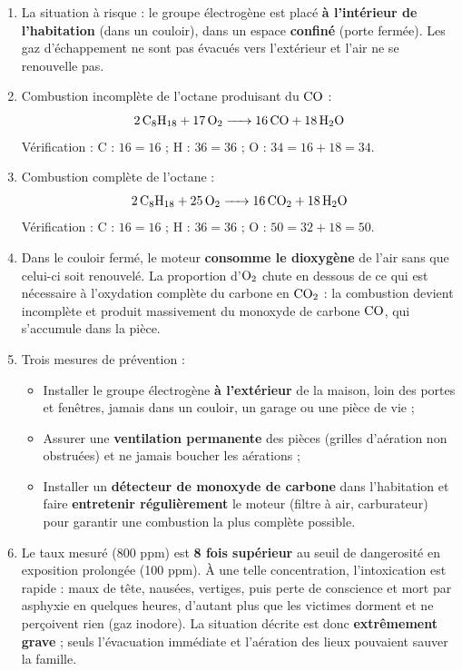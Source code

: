\documentclass[11pt]{article}
\begin{document}
\begin{corrige}
\begin{enumerate}
    \item La situation à risque : le groupe électrogène est placé \textbf{à l'intérieur de l'habitation} (dans un couloir), dans un espace \textbf{confiné} (porte fermée). Les gaz d'échappement ne sont pas évacués vers l'extérieur et l'air ne se renouvelle pas.
    \item Combustion incomplète de l'octane produisant du $\ce{CO}$ :
    \[ \ce{2C8H18 + 17O2 -> 16CO + 18H2O} \]
    Vérification : C : $16 = 16$ ; H : $36 = 36$ ; O : $34 = 16 + 18 = 34$.
    \item Combustion complète de l'octane :
    \[ \ce{2C8H18 + 25O2 -> 16CO2 + 18H2O} \]
    Vérification : C : $16 = 16$ ; H : $36 = 36$ ; O : $50 = 32 + 18 = 50$.
    \item Dans le couloir fermé, le moteur \textbf{consomme le dioxygène} de l'air sans que celui-ci soit renouvelé. La proportion d'$\ce{O2}$ chute en dessous de ce qui est nécessaire à l'oxydation complète du carbone en $\ce{CO2}$ : la combustion devient incomplète et produit massivement du monoxyde de carbone $\ce{CO}$, qui s'accumule dans la pièce.
    \item Trois mesures de prévention :
    \begin{itemize}
        \item Installer le groupe électrogène \textbf{à l'extérieur} de la maison, loin des portes et fenêtres, jamais dans un couloir, un garage ou une pièce de vie ;
        \item Assurer une \textbf{ventilation permanente} des pièces (grilles d'aération non obstruées) et ne jamais boucher les aérations ;
        \item Installer un \textbf{détecteur de monoxyde de carbone} dans l'habitation et faire \textbf{entretenir régulièrement} le moteur (filtre à air, carburateur) pour garantir une combustion la plus complète possible.
    \end{itemize}
    \item Le taux mesuré (800 ppm) est \textbf{8 fois supérieur} au seuil de dangerosité en exposition prolongée (100 ppm). À une telle concentration, l'intoxication est rapide : maux de tête, nausées, vertiges, puis perte de conscience et mort par asphyxie en quelques heures, d'autant plus que les victimes dorment et ne perçoivent rien (gaz inodore). La situation décrite est donc \textbf{extrêmement grave} ; seuls l'évacuation immédiate et l'aération des lieux pouvaient sauver la famille.
\end{enumerate}
\end{corrige}
\end{document}
